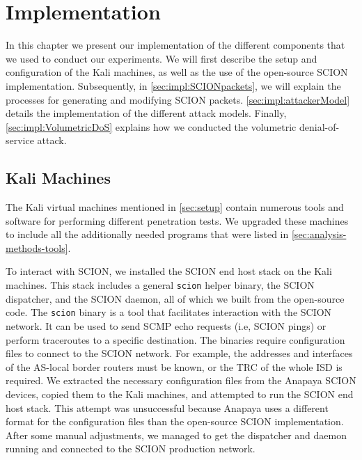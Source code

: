 \chapter{Implementation}
\label{ch:implementation}


In this chapter we present our implementation of the different components that we used to conduct our experiments.
We will first describe the setup and configuration of the Kali machines, as well as the use of the open-source SCION implementation.
Subsequently, in \cref{sec:impl:SCIONpackets}, we will explain the processes for generating and modifying SCION packets.
\cref{sec:impl:attackerModel} details the implementation of the different attack models.
Finally, \cref{sec:impl:VolumetricDoS} explains how we conducted the volumetric denial-of-service attack.

\section{Kali Machines}

The Kali virtual machines mentioned in \cref{sec:setup} contain numerous tools and software for performing different penetration tests.
We upgraded these machines to include all the additionally needed programs that were listed in \cref{sec:analysis-methods-tools}.

To interact with SCION, we installed the SCION end host stack on the Kali machines.
This stack includes a general \texttt{scion} helper binary, the SCION dispatcher, and the SCION daemon, all of which we built from the open-source code.
The \texttt{scion} binary is a tool that facilitates interaction with the SCION network.
It can be used to send SCMP echo requests (i.e, SCION pings) or perform traceroutes to a specific destination.
The binaries require configuration files to connect to the SCION network.
For example, the addresses and interfaces of the AS-local border routers must be known, or the TRC of the whole ISD is required.
We extracted the necessary configuration files from the Anapaya SCION devices, copied them to the Kali machines, and attempted to run the SCION end host stack.
This attempt was unsuccessful because Anapaya uses a different format for the configuration files than the open-source SCION implementation.
After some manual adjustments, we managed to get the dispatcher and daemon running and connected to the SCION production network.

